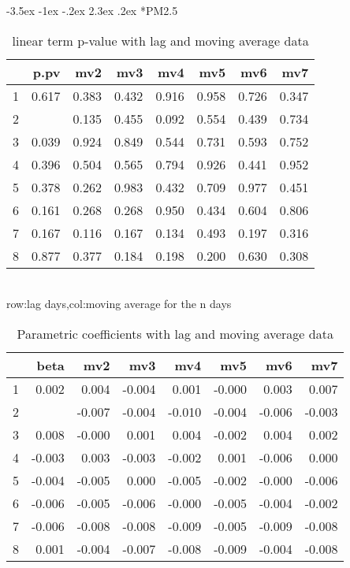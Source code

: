 \documentclass[a4paper, 12pt]{article}
\makeatletter
\def\large{\fontsize{14}{20}\selectfont}
\renewcommand\subsection{\@startsection {subsection}{1}{\z@}%
                                   {-3.5ex \@plus -1ex \@minus -.2ex}%
                                   {2.3ex \@plus.2ex}%
                                   {\centering\normalfont\large\bfseries}}
\makeatother
\begin{document}
\clearpage
\subsection*{PM2.5}
\begin{table}[h]
\centering
\caption{linear term p-value with lag and moving average data}
\begin{tabular}{rrrrrrrr}
  \hline
 & p.pv & mv2 & mv3 & mv4 & mv5 & mv6 & mv7 \\
  \hline
1 & 0.617 & 0.383 & 0.432 & 0.916 & 0.958 & 0.726 & 0.347 \\
  2 & \color{red}{0.009} & 0.135 & 0.455 & 0.092 & 0.554 & 0.439 & 0.734 \\
  3 & 0.039 & 0.924 & 0.849 & 0.544 & 0.731 & 0.593 & 0.752 \\
  4 & 0.396 & 0.504 & 0.565 & 0.794 & 0.926 & 0.441 & 0.952 \\
  5 & 0.378 & 0.262 & 0.983 & 0.432 & 0.709 & 0.977 & 0.451 \\
  6 & 0.161 & 0.268 & 0.268 & 0.950 & 0.434 & 0.604 & 0.806 \\
  7 & 0.167 & 0.116 & 0.167 & 0.134 & 0.493 & 0.197 & 0.316 \\
  8 & 0.877 & 0.377 & 0.184 & 0.198 & 0.200 & 0.630 & 0.308 \\
   \hline
\end{tabular}
\\row:lag days,col:moving average for the n days
\end{table}

\begin{table}[h]
\centering
\caption{Parametric coefficients with lag and moving average data}
\begin{tabular}{rrrrrrrr}
  \hline
 & beta & mv2 & mv3 & mv4 & mv5 & mv6 & mv7 \\
  \hline
1 & 0.002 & 0.004 & -0.004 & 0.001 & -0.000 & 0.003 & 0.007 \\
  2 & \color{red}{-0.011} & -0.007 & -0.004 & -0.010 & -0.004 & -0.006 & -0.003 \\
  3 & 0.008 & -0.000 & 0.001 & 0.004 & -0.002 & 0.004 & 0.002 \\
  4 & -0.003 & 0.003 & -0.003 & -0.002 & 0.001 & -0.006 & 0.000 \\
  5 & -0.004 & -0.005 & 0.000 & -0.005 & -0.002 & -0.000 & -0.006 \\
  6 & -0.006 & -0.005 & -0.006 & -0.000 & -0.005 & -0.004 & -0.002 \\
  7 & -0.006 & -0.008 & -0.008 & -0.009 & -0.005 & -0.009 & -0.008 \\
  8 & 0.001 & -0.004 & -0.007 & -0.008 & -0.009 & -0.004 & -0.008 \\
   \hline
\end{tabular}
\end{table}
\clearpage
\end{document}
